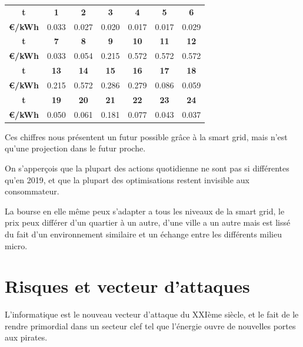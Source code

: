 \begin{tabular}{ | c | c | c | c | c | c | c | }
  \hline
  \textbf{t} & \textbf{1} & \textbf{2} & \textbf{3} & \textbf{4} & \textbf{5} & \textbf{6} \\
  \textbf{€/kWh} & 0.033 & 0.027 & 0.020 & 0.017 & 0.017 & 0.029 \\
  \hline
  \textbf{t} & \textbf{7} & \textbf{8} & \textbf{9} & \textbf{10} & \textbf{11} & \textbf{12} \\
  \textbf{€/kWh} & 0.033 & 0.054 & 0.215 & 0.572 & 0.572 & 0.572 \\
  \hline
  \textbf{t} & \textbf{13} & \textbf{14} & \textbf{15} & \textbf{16} & \textbf{17} & \textbf{18} \\
  \textbf{€/kWh} & 0.215 & 0.572 & 0.286 & 0.279 & 0.086 & 0.059 \\
  \hline
  \textbf{t} & \textbf{19} & \textbf{20} & \textbf{21} & \textbf{22} & \textbf{23} & \textbf{24} \\
  \textbf{€/kWh} & 0.050 & 0.061 & 0.181 & 0.077 & 0.043 & 0.037 \\
  \hline
\end{tabular}


Ces chiffres nous présentent un futur possible grâce à la smart grid, mais n'est qu'une projection dans le futur proche.

On s'apperçois que la plupart des actions quotidienne ne sont pas si différentes qu'en 2019, et que la plupart des 
optimisations restent invisible aux consommateur.

La bourse en elle même peux s'adapter a tous les niveaux de la smart grid, le prix peux différer d'un quartier à un autre, 
d'une ville a un autre mais est lissé du fait d'un environnement similaire et un échange entre les différents milieu micro.

\section{Risques et vecteur d'attaques}

L'informatique est le nouveau vecteur d'attaque du XXIème siècle, et le fait de le rendre primordial
dans un secteur clef tel que l'énergie ouvre de nouvelles portes aux pirates.
